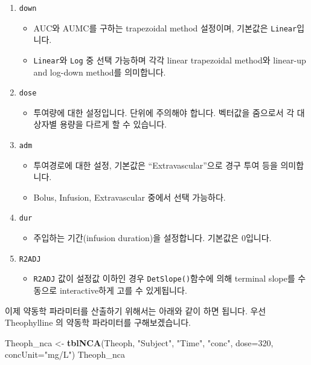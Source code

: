 \documentclass[12pt,]{krantz}
\newenvironment{Shaded}{\begin{snugshade}}{\end{snugshade}}
\newcommand{\DataTypeTok}[1]{\textcolor[rgb]{0.13,0.29,0.53}{#1}}
\newcommand{\DecValTok}[1]{\textcolor[rgb]{0.00,0.00,0.81}{#1}}
\newcommand{\KeywordTok}[1]{\textcolor[rgb]{0.13,0.29,0.53}{\textbf{#1}}}
\newcommand{\NormalTok}[1]{#1}
\newcommand{\StringTok}[1]{\textcolor[rgb]{0.31,0.60,0.02}{#1}}
\providecommand{\tightlist}{%
  \setlength{\itemsep}{0pt}\setlength{\parskip}{0pt}}
\begin{document}
\begin{enumerate}
\def\labelenumi{\arabic{enumi}.}
\tightlist
\item
  \texttt{down}

  \begin{itemize}
  \tightlist
  \item
    AUC와 AUMC를 구하는 trapezoidal method 설정이며, 기본값은 \texttt{Linear}입니다.
  \item
    \texttt{Linear}와 \texttt{Log} 중 선택 가능하며 각각 linear trapezoidal method와 linear-up and log-down method를 의미합니다.
  \end{itemize}
\item
  \texttt{dose}

  \begin{itemize}
  \tightlist
  \item
    투여량에 대한 설정입니다. 단위에 주의해야 합니다. 벡터값을 줌으로서 각 대상자별 용량을 다르게 할 수 있습니다.
  \end{itemize}
\item
  \texttt{adm}

  \begin{itemize}
  \tightlist
  \item
    투여경로에 대한 설정, 기본값은 ``Extravascular''으로 경구 투여 등을 의미합니다.
  \item
    Bolus, Infusion, Extravascular 중에서 선택 가능하다.
  \end{itemize}
\item
  \texttt{dur}

  \begin{itemize}
  \tightlist
  \item
    주입하는 기간(infusion duration)을 설정합니다. 기본값은 0입니다.
  \end{itemize}
\item
  \texttt{R2ADJ}

  \begin{itemize}
  \tightlist
  \item
    \texttt{R2ADJ} 값이 설정값 이하인 경우 \texttt{DetSlope()}함수에 의해 terminal slope를 수동으로 interactive하게 고를 수 있게됩니다.
  \end{itemize}
\end{enumerate}

이제 약동학 파라미터를 산출하기 위해서는 아래와 같이 하면 됩니다.
우선 Theophylline 의 약동학 파라미터를 구해보겠습니다.

\begin{Shaded}
\begin{Highlighting}[]
\NormalTok{Theoph_nca <-}\StringTok{ }\KeywordTok{tblNCA}\NormalTok{(Theoph, }\StringTok{"Subject"}\NormalTok{, }\StringTok{"Time"}\NormalTok{, }\StringTok{"conc"}\NormalTok{, }
                     \DataTypeTok{dose=}\DecValTok{320}\NormalTok{, }\DataTypeTok{concUnit=}\StringTok{"mg/L"}\NormalTok{)}
\NormalTok{Theoph_nca}
\end{Highlighting}
\end{Shaded}
\end{document}

